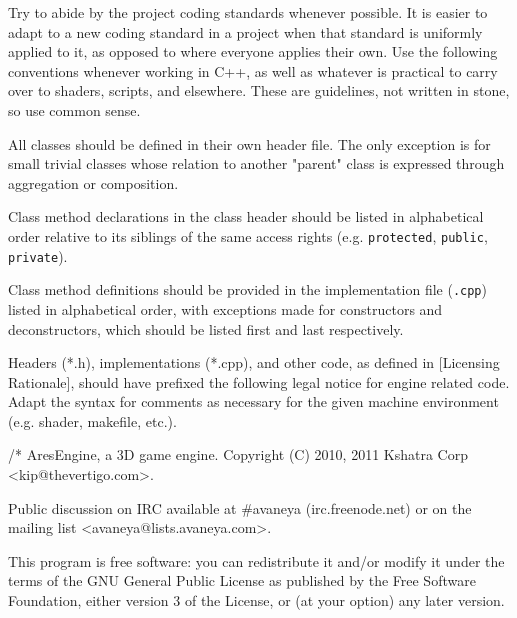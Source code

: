 

Try to abide by the project coding standards whenever possible. It is easier to adapt to a new coding standard in a project when that standard is uniformly applied to it, as opposed to where everyone applies their own. Use the following conventions whenever working in C++, as well as whatever is practical to carry over to shaders, scripts, and elsewhere. These are guidelines, not written in stone, so use common sense.


\startitemize[3]
\setupwhitespace[big]
\item
All classes should be defined in their own header file. The only exception is for small trivial classes whose relation to another "parent" class is expressed through aggregation or composition.

\item
Class method declarations in the class header should be listed in alphabetical order relative to its siblings of the same access rights (e.g. {\tt protected}, {\tt public}, {\tt private}).

\item
Class method definitions should be provided in the implementation file ({\tt *.cpp}) listed in alphabetical order, with exceptions made for constructors and deconstructors, which should be listed first and last respectively.
\stopitemize

Headers (*.h), implementations (*.cpp), and other code, as defined in [Licensing Rationale], should have prefixed the following legal notice for engine related code. Adapt the syntax for comments as necessary for the given machine environment (e.g. shader, makefile, etc.).

\startCodeExample
/*
    AresEngine, a 3D game engine.
    Copyright (C) 2010, 2011 Kshatra Corp <kip@thevertigo.com>.

    Public discussion on IRC available at #avaneya (irc.freenode.net)
    or on the mailing list <avaneya@lists.avaneya.com>.

    This program is free software: you can redistribute it and/or modify
    it under the terms of the GNU General Public License as published by
    the Free Software Foundation, either version 3 of the License, or
    (at your option) any later version.

